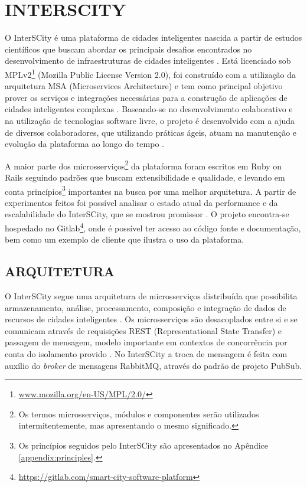 \chapter[INTERSCITY]{INTERSCITY}
\label{chapter:interscity}

O InterSCity é uma plataforma de cidades inteligentes nascida a partir de
estudos científicos que buscam abordar os principais desafios encontrados
no desenvolvimento de infraestruturas de cidades inteligentes \cite{nof2016}.
Está licenciado sob
MPLv2\footnote{\url{www.mozilla.org/en-US/MPL/2.0/}} (Mozilla Public License
Version 2.0), foi construído com a
utilização da arquitetura MSA (Microservices Architecture) e tem como principal
objetivo prover os serviços e integrações necessárias para a construção de
aplicações de cidades inteligentes complexas \cite{delesposte2017}. Baseando-se
no desenvolvimento colaborativo e na utilização de tecnologias software livre,
o projeto é desenvolvido com a ajuda de diversos colaboradores, que utilizando
práticas ágeis, atuam na manutenção e evolução da plataforma ao longo do tempo
\cite{delesposte2017}.

A maior parte dos microsserviços\footnote{Os termos microsserviços, módulos e
componentes serão utilizados intermitentemente, mas apresentando o mesmo
significado.} da plataforma foram escritos em Ruby on Rails
seguindo padrões que buscam extensibilidade e qualidade, e levando em conta
princípios\footnote{Os princípios seguidos pelo InterSCity são apresentados no
Apêndice \ref{appendix:principles}.} importantes na busca por uma melhor arquitetura.
A partir de experimentos feitos foi possível analisar
o estado atual da performance e da escalabilidade do InterSCity, que se mostrou
promissor \cite{delesposte2017}. O projeto encontra-se hospedado no
Gitlab\footnote{\url{https://gitlab.com/smart-city-software-platform}},
onde é possível ter acesso ao código fonte e documentação, bem como um exemplo de
cliente que ilustra o uso da plataforma.

\section{ARQUITETURA}
\label{sec:architecture}

O InterSCity segue uma arquitetura de microsserviços distribuída que
possibilita armazenamento, análise, processamento, composição e integração de
dados de recursos de cidades inteligentes \cite{delesposte2017}. Os
microsserviços são desacoplados entre si e se comunicam através de requisições REST
(Representational State Transfer) e passagem de mensagem, modelo importante em
contextos de concorrência por conta do isolamento provido \cite{armstrong2003}.
No InterSCity a troca de mensagem é feita com auxílio do \textit{broker} de
mensagens RabbitMQ, através do padrão de projeto PubSub.

